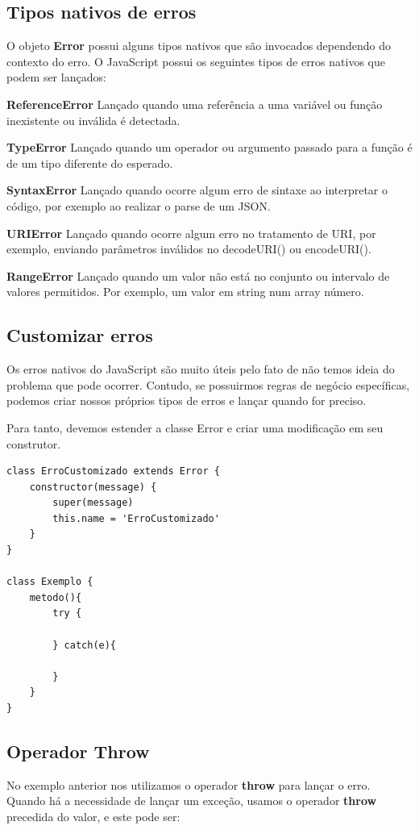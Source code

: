 \subsection{Tipos nativos de erros}
O objeto \textbf{Error} possui alguns tipos nativos que são invocados dependendo do contexto do erro. O JavaScript possui os seguintes tipos de erros nativos que podem ser lançados:	

\textbf{ReferenceError}
Lançado quando uma referência a uma variável ou função inexistente ou inválida é detectada.

\textbf{TypeError}
Lançado quando um operador ou argumento passado para a função é de um tipo diferente do esperado.

\textbf{SyntaxError}
Lançado quando ocorre algum erro de sintaxe ao interpretar o código, por exemplo ao realizar o parse de um JSON.

\textbf{URIError}
Lançado quando ocorre algum erro no tratamento de URI, por exemplo, enviando parâmetros inválidos no decodeURI() ou encodeURI().

\textbf{RangeError}
Lançado quando um valor não está no conjunto ou intervalo de valores permitidos. Por exemplo, um valor em string num array número.

\subsection{Customizar erros}
Os erros nativos do JavaScript são muito úteis pelo fato de não temos ideia do problema que pode ocorrer. Contudo, se possuirmos regras de negócio específicas, podemos criar nossos próprios tipos de erros e lançar quando for preciso.

Para tanto, devemos estender a classe Error e criar uma modificação em seu construtor.

\begin{verbatim}
class ErroCustomizado extends Error {
	constructor(message) {
		super(message)
		this.name = 'ErroCustomizado'
	}
}

class Exemplo {
	metodo(){
		try {
		
		} catch(e){
			
		}
	}
}
\end{verbatim}

\subsection{Operador Throw}
No exemplo anterior nos utilizamos o operador \textbf{throw} para lançar o erro. Quando há a necessidade de lançar um exceção, usamos o operador \textbf{throw} precedida do valor, e este pode ser:

